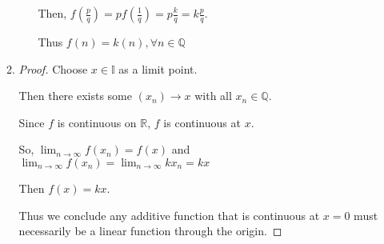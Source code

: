 \documentclass[12pt,letterpaper]{article}
\begin{document}
\begin{enumerate}[label=Exercise 4.3.\arabic*]
\begin{enumerate}
\begin{itemize}
              Then, $f\left(\frac{p}{q}\right) = p f\left(\frac{1}{q}\right) = p \frac{k}{q} = k \frac{p}{q}$.

              Thus $f(n) = k(n), \forall n \in \mathbb{Q}$
          \end{itemize}
        \item
          \begin{proof}
            Choose $x \in \mathbb{I}$ as a limit point.

            Then there exists some $(x_n) \to x$ with all $x_n \in \mathbb{Q}$.

            Since $f$ is continuous on $\mathbb{R}$,
            $f$ is continuous at $x$.

            So, $\lim_{n \to \infty} f(x_n) = f(x)$ and $\lim_{n \to \infty} f(x_n) = \lim_{n \to \infty} k x_n = k x$

            Then $f(x) = k x$.

            Thus we conclude any additive function that is continuous at $x = 0$ must necessarily be a linear function through the origin.
          \end{proof}
      \end{enumerate}
  \end{enumerate}
\end{document}
